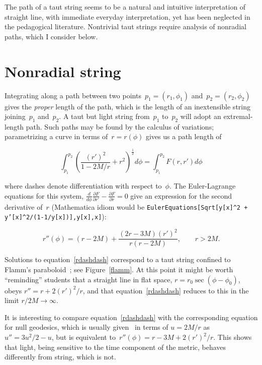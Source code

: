 \documentclass[review]{elsarticle}
\begin{document}
The path of a taut string seems to be a natural and intuitive
interpretation of straight line, with immediate everyday
interpretation, yet has been neglected in the pedagogical literature.
Nontrivial taut strings require analysis of nonradial paths, which I
consider below.

\section{Nonradial string}
Integrating along a path between two
points~$p_1=\left(r_1,\phi_1\right)$ and~$p_2=\left(r_2,\phi_2\right)$
gives the {\em proper} length of the path, which is the length of an
inextensible string joining~$p_1$ and~$p_2$.  A taut but light string
from~$p_1$ to~$p_2$ will adopt an extremal-length path.  Such paths
may be found by the calculus of variations; parametrizing a curve in
terms of~$r=r\left(\phi\right)$ gives us a path length of


\begin{equation}
  \int_{p_1}^{p_2}\left(\frac{\left(r'\right)^2}{1-2M/r} + r^2\right)^\frac{1}{2}d\phi=
  \int_{p_1}^{p_2}F\left(r,r'\right)d\phi
\end{equation}

\noindent where dashes denote differentiation with respect to~$\phi$.
The Euler-Lagrange equations for this system,
$\frac{d}{d\phi}\frac{\partial F}{\partial r'}-\frac{\partial
  F}{\partial r}=0$ give an expression for the second derivative
of~$r$ (Mathematica idiom would be {\tt EulerEquations[Sqrt[y[x]\^{}2
      + y'[x]\^{}2/(1-1/y[x])],y[x],x]}):

\begin{equation}\label{rdashdash}
  r''\left(\phi\right) =
  (r-2M) + \frac{(2r-3M)\left(r'\right)^2}{r\left(r-2M\right)},\qquad r>2M.
\end{equation}

\noindent Solutions to equation~\ref{rdashdash} correspond to a taut
string confined to Flamm's paraboloid~\cite{flamm1916}; see
Figure~\ref{flamm}.  At this point it might be worth ``reminding''
students that a straight line in flat space,
$r=r_0\sec\left(\phi-\phi_0\right)$, obeys
$r''=r+2\left(r'\right)^2/r$, and that equation~\ref{rdashdash}
reduces to this in the limit $r/2M\longrightarrow\infty$.

It is interesting to compare equation~\ref{rdashdash} with the
corresponding equation for null geodesics, which is usually
given~\cite{wald} in terms of $u=2M/r$ as $u''=3u^2/2-u$, but is
equivalent to~$r''\left(\phi\right)=r-3M+2\left(r'\right)^2/r$.  This
shows that light, being sensitive to the time component of the metric,
behaves differently from string, which is not.
\end{document}
